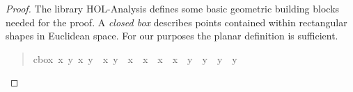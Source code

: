 \begin{isabellebody}
\begin{isamarkuptext}
\begin{lemma} \label{lemma:core_argument}
 \vskip 0pt
 \vskip 0pt
 \vskip 0pt
 \vskip 0pt
 \vskip 0pt
\isa{{\isasymLongrightarrow}} 
\end{lemma}
\begin{proof}
The library HOL-Analysis defines some basic geometric building blocks needed for the proof. A \textit{closed box}
describes points contained within rectangular shapes in Euclidean space. For our purposes the planar definition is sufficient.

\begin{quote}
%
\begin{isabelle}%
cbox\ {\isacharparenleft}x\ y\ {\isacharparenleft}x\ y\ {\isacharequal}\ {\isacharbraceleft}{\isacharparenleft}x{\isacharcomma}\ y{\isacharparenright}\ {\isacharbar}\ x\ {\isasymle}\ x\ {\isasymand}\ x\ {\isasymle}\ x\ {\isasymand}\ y\ {\isasymle}\ y\ {\isasymand}\ y\ {\isasymle}\ y%
\end{isabelle}
\end{quote}


\end{proof}
\end{isamarkuptext}
\end{isabellebody}
